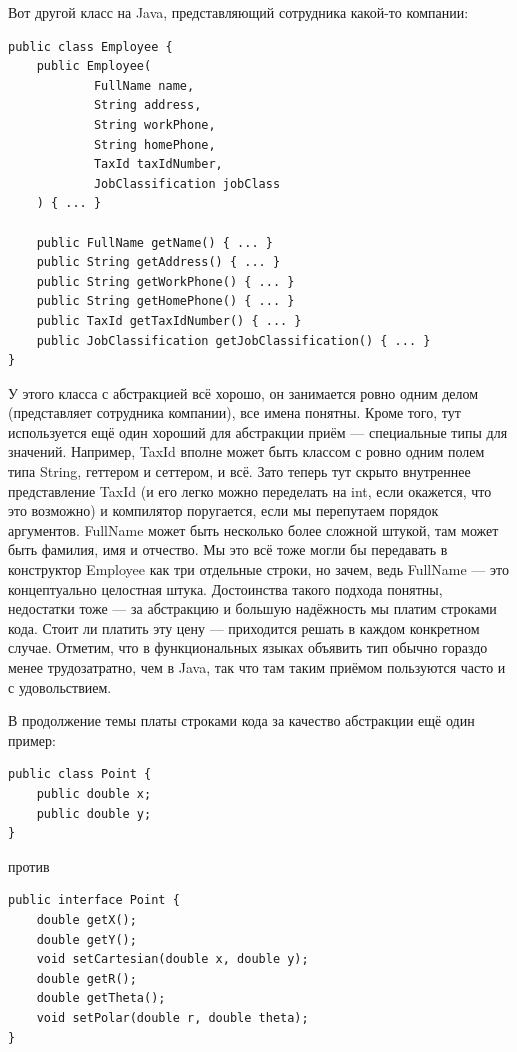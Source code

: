 \documentclass{../../text-style}
\begin{document}
Вот другой класс на Java, представляющий сотрудника какой-то компании:

\begin{verbatim}
public class Employee {
    public Employee(
            FullName name,
            String address,
            String workPhone,
            String homePhone,
            TaxId taxIdNumber,
            JobClassification jobClass
    ) { ... }

    public FullName getName() { ... }
    public String getAddress() { ... }
    public String getWorkPhone() { ... }
    public String getHomePhone() { ... }
    public TaxId getTaxIdNumber() { ... }
    public JobClassification getJobClassification() { ... }
}
\end{verbatim}

У этого класса с абстракцией всё хорошо, он занимается ровно одним делом (представляет сотрудника компании), все имена понятны. Кроме того, тут используется ещё один хороший для абстракции приём --- специальные типы для значений. Например, TaxId вполне может быть классом с ровно одним полем типа String, геттером и сеттером, и всё. Зато теперь тут скрыто внутреннее представление TaxId (и его легко можно переделать на int, если окажется, что это возможно) и компилятор поругается, если мы перепутаем порядок аргументов. FullName может быть несколько более сложной штукой, там может быть фамилия, имя и отчество. Мы это всё тоже могли бы передавать в конструктор Employee как три отдельные строки, но зачем, ведь FullName --- это концептуально целостная штука. Достоинства такого подхода понятны, недостатки тоже --- за абстракцию и большую надёжность мы платим строками кода. Стоит ли платить эту цену --- приходится решать в каждом конкретном случае. Отметим, что в функциональных языках объявить тип обычно гораздо менее трудозатратно, чем в Java, так что там таким приёмом пользуются часто и с удовольствием.

В продолжение темы платы строками кода за качество абстракции ещё один пример:

\begin{verbatim}
public class Point {
    public double x;
    public double y;
}
\end{verbatim}

против

\begin{verbatim}
public interface Point {
    double getX();
    double getY();
    void setCartesian(double x, double y);
    double getR();
    double getTheta();
    void setPolar(double r, double theta);
}
\end{verbatim}
\end{document}
